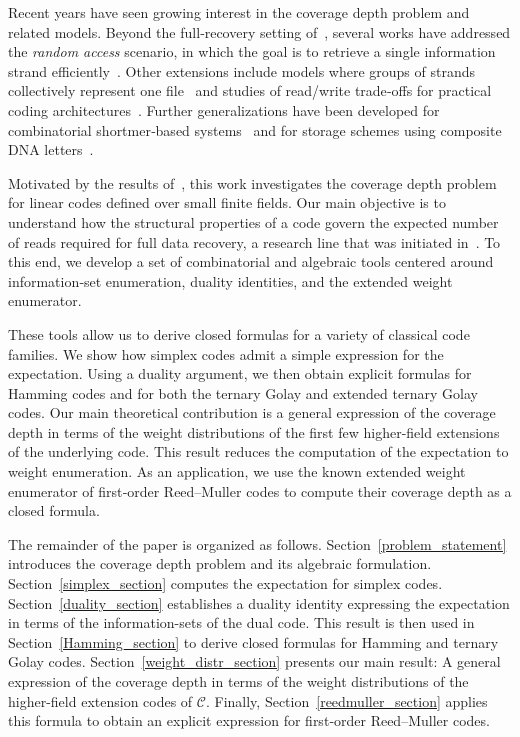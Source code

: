 \documentclass[11pt,a4paper,reqno,twoside]{article}
\theoremstyle{definition}
\newcommand{\mC}{\mathcal{C}}
\begin{document}
Recent years have seen growing interest in the coverage depth problem and related models. Beyond the full‑recovery setting of~\cite{cover_your_bases}, several works have addressed the \emph{random access} scenario, in which the goal is to retrieve a single information strand efficiently~\cite{rel1, rel2, a_combinatorial_perspective, rel3, rel4, rel5}. Other extensions include models where groups of strands collectively represent one file~\cite{other_rel_1} and studies of read/write trade‑offs for practical coding architectures~\cite{other_rel_2}. Further generalizations have been developed for combinatorial shortmer‑based systems~\cite{ext1, ext2,ext3} and for storage schemes using composite DNA letters~\cite{ext4}.


Motivated by the results of~\cite{cover_your_bases}, this work investigates the coverage depth problem for linear codes defined over small finite fields. Our main objective is to understand how the structural properties of a code
govern the expected number of reads required for full data recovery,
a research line that was initiated in~\cite{isit_paper}. To this end, we develop a set of combinatorial and algebraic tools centered around information‑set enumeration, duality identities, and the extended weight enumerator.


These tools allow us to derive closed formulas for a variety of classical code families. We show how simplex codes admit a simple expression for the expectation. Using a duality argument, we then obtain explicit formulas for Hamming codes and for both the ternary Golay and extended ternary Golay codes. Our main theoretical contribution is a general expression of the coverage depth in terms of the weight distributions of the first few higher-field extensions of the underlying code. This result reduces the computation of the expectation to weight enumeration. As an application, we use the known extended weight enumerator of first‑order Reed–Muller codes to compute their coverage depth as a closed formula.


The remainder of the paper is organized as follows.
Section~\ref{problem_statement} introduces the coverage depth problem and its algebraic formulation. 
Section~\ref{simplex_section} computes the expectation for simplex codes. 
Section~\ref{duality_section} establishes a duality identity expressing the expectation 
in terms of the information-sets of the dual code. 
This result is then used in Section~\ref{Hamming_section} to derive closed formulas for Hamming and ternary Golay codes. 
Section~\ref{weight_distr_section} presents our main result: A general expression of the coverage depth in terms of the weight distributions of the higher-field extension codes of 
$\mC$. 
Finally, Section~\ref{reedmuller_section} applies this formula to obtain an explicit expression for first‑order Reed–Muller codes.
\end{document}
